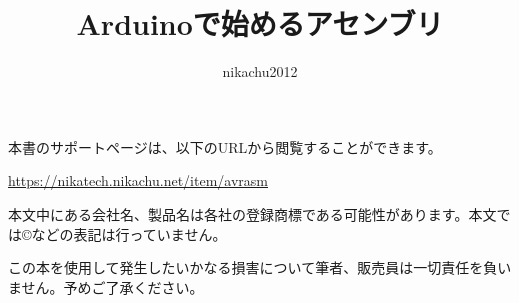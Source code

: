 \documentclass[b5j, twoside, 9pt]{ltjsbook}
\newcommand{\mybooktitle}   {Arduinoで始めるアセンブリ}
\newcommand{\mybookauthor}  {nikachu2012}
\begin{document}
\ifdefined\isPaperPublishing\else
    
    \newpage
    \thispagestyle{empty}
    \null
    \newpage
    \setcounter{page}{1} %
\fi

\title{\mybooktitle}
\author{\mybookauthor}
\date{}
\maketitle

\null
\vfill

\begin{tcolorbox}[breakable, colframe=black, sharp corners]
    本書のサポートページは、以下のURLから閲覧することができます。
    \begin{center}
        \url{https://nikatech.nikachu.net/item/avrasm}
    \end{center}
\end{tcolorbox}


\begin{tcolorbox}[breakable, colframe=black, sharp corners]
    本文中にある会社名、製品名は各社の登録商標である可能性があります。本文では\copyright などの表記は行っていません。
\end{tcolorbox}

\begin{tcolorbox}[breakable, colframe=black, sharp corners]
    この本を使用して発生したいかなる損害について筆者、販売員は一切責任を負いません。予めご了承ください。
\end{tcolorbox}

\vspace*{10mm}



\tableofcontents







\ifdefined\isPaperPublishing\else
    \newpage
    \thispagestyle{empty}
    \null
    \newpage
    
\fi
\end{document}
